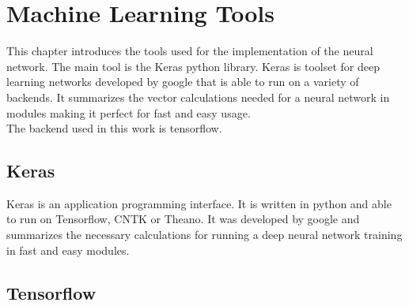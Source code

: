 \chapter{Machine Learning Tools}

This chapter introduces the tools used for the implementation of the neural network. The main tool is the Keras python library. Keras is toolset for deep learning networks developed by google that is able to run on a variety of backends. It summarizes the vector calculations needed for a neural network in modules making it perfect for fast and easy usage.\\
The backend used in this work is tensorflow.

\section{Keras}

Keras is an application programming interface. It is written in python and able to run on Tensorflow, CNTK or Theano. It was developed by google and summarizes the necessary calculations for running a deep neural network training in fast and easy modules.

\cite{chollet2015keras}

\section{Tensorflow}
\cite{tensorflow2015-whitepaper}